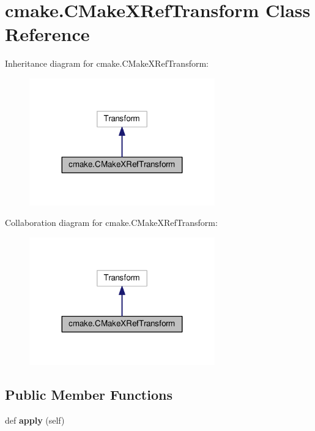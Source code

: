 \hypertarget{classcmake_1_1CMakeXRefTransform}{}\section{cmake.\+C\+Make\+X\+Ref\+Transform Class Reference}
\label{classcmake_1_1CMakeXRefTransform}


Inheritance diagram for cmake.\+C\+Make\+X\+Ref\+Transform\+:
\nopagebreak
\begin{figure}[H]
\begin{center}
\leavevmode
\includegraphics[width=227pt]{classcmake_1_1CMakeXRefTransform__inherit__graph}
\end{center}
\end{figure}


Collaboration diagram for cmake.\+C\+Make\+X\+Ref\+Transform\+:
\nopagebreak
\begin{figure}[H]
\begin{center}
\leavevmode
\includegraphics[width=227pt]{classcmake_1_1CMakeXRefTransform__coll__graph}
\end{center}
\end{figure}
\subsection*{Public Member Functions}
\begin{DoxyCompactItemize}
\item 
def {\bfseries apply} (self)\hypertarget{classcmake_1_1CMakeXRefTransform_a8727f9aa2814e7491695df2544981eb6}{}\label{classcmake_1_1CMakeXRefTransform_a8727f9aa2814e7491695df2544981eb6}

\end{DoxyCompactItemize}
